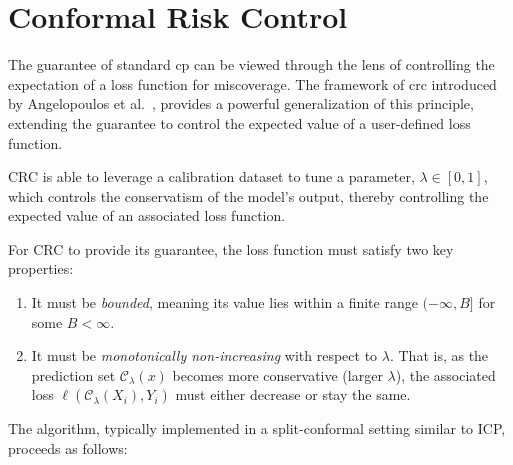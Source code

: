 \section{Conformal Risk Control}

The guarantee of standard \gls{cp} can be viewed through the lens of
controlling the expectation of a loss function for miscoverage. The
framework of \gls{crc} introduced by Angelopoulos et al.~\cite{angelopoulos2023crc},
provides a powerful generalization of this principle, extending the guarantee to
control the expected value of a user-defined loss function.

CRC is able to leverage a calibration dataset to tune a parameter, \(\lambda \in [0, 1]\),
which controls the conservatism of the model's output,
thereby controlling the expected value of an associated loss function.

For CRC to provide its guarantee, the loss function must satisfy two key properties:
\begin{enumerate}
    \item It must be \emph{bounded}, meaning its value lies within a finite range \((-\infty, B]\)
    for some \(B < \infty\).

    \item It must be \emph{monotonically non-increasing} with respect to \(\lambda\).
    That is, as the prediction set \(\mathcal{C}_\lambda(x)\) becomes more conservative (larger \(\lambda\)),
    the associated loss \(\ell(\mathcal{C}_\lambda(X_i), Y_i)\) must either decrease or stay the same.
\end{enumerate}
The algorithm, typically implemented in a split-conformal setting similar to ICP,
proceeds as follows:

